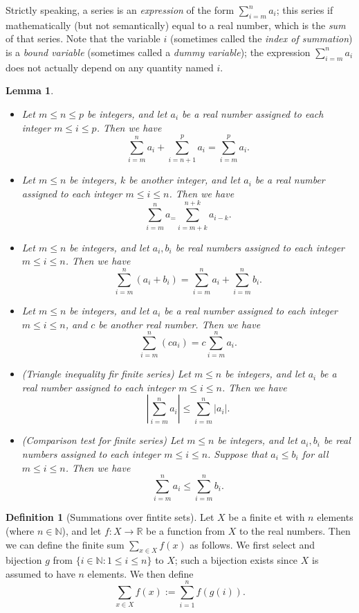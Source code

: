 \documentclass[
]{book}
\providecommand{\tightlist}{%
  \setlength{\itemsep}{0pt}\setlength{\parskip}{0pt}}
\newtheorem{lemma}{Lemma}[chapter]
\theoremstyle{definition}
\newtheorem{definition}{Definition}[chapter]
\theoremstyle{definition}
\theoremstyle{definition}
\theoremstyle{definition}
\theoremstyle{remark}
\begin{document}
Strictly speaking, a series is an \emph{expression} of the form \(\sum_{i=m}^na_i\); this series if mathematically (but not semantically) equal to a real number, which is the \emph{sum} of that series. Note that the variable \(i\) (sometimes called the \emph{index of summation}) is a \emph{bound variable} (sometimes called a \emph{dummy variable}); the expression \(\sum_{i=m}^na_i\) does not actually depend on any quantity named \(i\).

\begin{lemma}
\leavevmode

\begin{itemize}
\tightlist
\item
  Let \(m\leq n\leq p\) be integers, and let \(a_i\) be a real number assigned to each integer \(m\leq i \leq p\). Then we have
  \[
  \sum_{i=m}^na_i + \sum_{i=n+1}^pa_i=\sum_{i=m}^pa_i.
  \]
\item
  Let \(m\leq n\) be integers, \(k\) be another integer, and let \(a_i\) be a real number assigned to each integer \(m\leq i \leq n\). Then we have
  \[
  \sum_{i=m}^na_=\sum_{i=m+k}^{n+k}a_{i-k}.
  \]
\item
  Let \(m\leq n\) be integers, and let \(a_i, b_i\) be real numbers assigned to each integer \(m\leq i \leq n\). Then we have
  \[
  \sum_{i=m}^n(a_i+b_i)=\sum_{i=m}^na_i+\sum_{i=m}^nb_i.
  \]
\item
  Let \(m\leq n\) be integers, and let \(a_i\) be a real number assigned to each integer \(m\leq i \leq n\), and \(c\) be another real number. Then we have
  \[
  \sum_{i=m}^n(ca_i)=c\sum_{i=m}^na_i.
  \]
\item
  (Triangle inequality fir finite series) Let \(m\leq n\) be integers, and let \(a_i\) be a real number assigned to each integer \(m\leq i \leq n\). Then we have
  \[
  \left|\sum_{i=m}^na_i\right|\leq\sum_{i=m}^n|a_i|.
  \]
\item
  (Comparison test for finite series) Let \(m\leq n\) be integers, and let \(a_i, b_i\) be real numbers assigned to each integer \(m\leq i \leq n\). Suppose that \(a_i\leq b_i\) for all \(m\leq i\leq n\). Then we have
  \[
  \sum_{i=m}^na_i\leq\sum_{i=m}^nb_i.
  \]
\end{itemize}

\end{lemma}

\begin{definition}[Summations over fintite sets]
Let \(X\) be a finite et with \(n\) elements (where \(n\in \mathbb{N}\)), and let \(f:X\to \mathbb{R}\) be a function from \(X\) to the real numbers. Then we can define the finite sum \(\sum_{x\in X}f(x)\) as follows. We first select and bijection \(g\) from \(\{i\in\mathbb{N}:1\leq i\leq n\}\) to \(X\); such a bijection exists since \(X\) is assumed to have \(n\) elements. We then define
\[
\sum_{x\in X}f(x) :=\sum_{i=1}^nf(g(i)).
\]
\end{definition}
\end{document}
